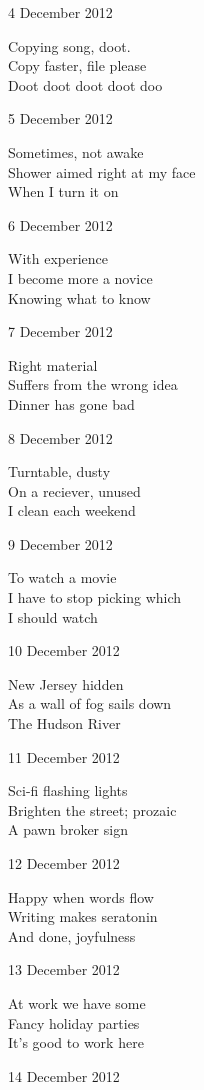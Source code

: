 \documentclass[12pt]{article}
\begin{document}
\newpage

4 December 2012

Copying song, doot. \\
Copy faster, file please \\
Doot doot doot doot doo

5 December 2012

Sometimes, not awake \\
Shower aimed right at my face \\
When I turn it on

6 December 2012

With experience \\
I become more a novice \\
Knowing what to know

7 December 2012

Right material \\
Suffers from the wrong idea \\
Dinner has gone bad

8 December 2012

Turntable, dusty \\
On a reciever, unused \\
I clean each weekend

9 December 2012

To watch a movie \\
I have to stop picking which \\
I should watch

10 December 2012

New Jersey hidden \\
As a wall of fog sails down \\
The Hudson River

\newpage

11 December 2012

Sci-fi flashing lights \\
Brighten the street; prozaic \\
A pawn broker sign

12 December 2012

Happy when words flow \\
Writing makes seratonin \\
And done, joyfulness

13 December 2012

At work we have some \\
Fancy holiday parties \\
It's good to work here

14 December 2012
\end{document}
